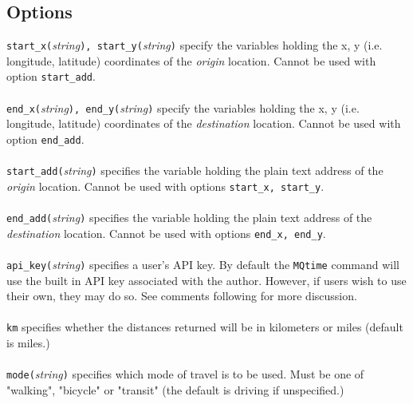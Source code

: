 \documentclass[12pt]{article}
\begin{document}
\subsection{Options}
\verb|start_x(|\textit{string}\verb|), start_y(|\textit{string}\verb|)| specify the variables holding the x, y (i.e. longitude, latitude) coordinates of the \textit{origin} location. Cannot be used with option \verb|start_add|.
\\ \\
\verb|end_x(|\textit{string}\verb|), end_y(|\textit{string}\verb|)| specify the variables holding the x, y (i.e. longitude, latitude) coordinates of the \textit{destination} location. Cannot be used with option \verb|end_add|.
\\ \\
\verb|start_add(|\textit{string}\verb|)| specifies the variable holding the plain text address of the \textit{origin} location. Cannot be used with options \verb|start_x, start_y|.
\\ \\
\verb|end_add(|\textit{string}\verb|)| specifies the variable holding the plain text address of the \textit{destination} location. Cannot be used with options \verb|end_x, end_y|.
\\ \\
\verb|api_key(|\textit{string}\verb|)| specifies a user's API key. By default the \verb|MQtime| command will use the built in API key associated with the author. However, if users wish to use their own, they may do so. See comments following for more discussion.
\\ \\
\verb|km| specifies whether the distances returned will be in kilometers or miles (default is miles.)
\\ \\
\verb|mode(|\textit{string}\verb|)| specifies which mode of travel is to be used. Must be one of "walking", "bicycle" or "transit" (the default is driving if unspecified.) 
\end{document}
